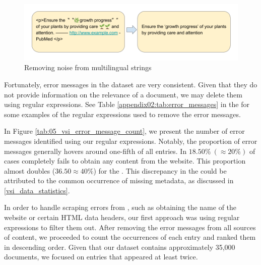 \begin{figure}
    \centering
    \includegraphics[width=\textwidth]{Figures/05/05_multilingual_string_cleaning.png}
    \caption{Removing noise from multilingual strings}
    \label{fig:05_multilingual_string_cleaning}
\end{figure}


\label{vsi_deleting_error_messages}

Fortunately, error messages in the dataset are very consistent. Given that they do not provide information on the relevance of a document, we may delete them using regular expressions. See Table \ref{appendix02:tab:error_messages} in the \appendixname{} for some examples of the regular expressions used to remove the error messages. 



In Figure \ref{tab:05_vsi_error_message_count}, we present the number of error messages identified using our regular expressions. Notably, the proportion of error messages generally hovers around one-fifth of all entries. In $18.50\%\ (\approx 20\%)$ of cases \trafilatura{} completely fails to obtain any content from the website. This proportion almost doubles ($36.50\approx 40\%$) for the \trafilaturaAbstract{}. This discrepancy in the \trafilaturaAbstract{} could be attributed to the common occurrence of missing metadata, as discussed in \headerName{} \ref{vsi_data_statistics}.




In order to handle scraping errors from \trafilatura{}, such as obtaining the name of the website or certain HTML data headers, our first approach was using regular expressions to filter them out. After removing the error messages from all sources of content, we proceeded to count the occurrences of each entry and ranked them in descending order. Given that our dataset contains approximately 35,000 documents, we focused on entries that appeared at least twice.

